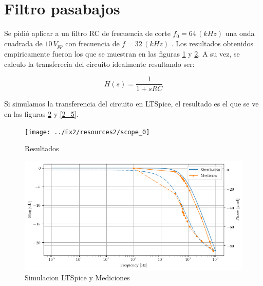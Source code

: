 \section{Filtro pasabajos}

Se pidió aplicar a un filtro RC de frecuencia de corte $f_{0}=64\,(kHz)$
una onda cuadrada de $10\,V_{pp}$ con frecuencia de $f=32\,(kHz)$
. Los resultados obtenidos empiricamente fueron los que se muestran
en las figuras \ref{2_1} y \ref{2_4}. A su vez, se calculo la transferecia
del circuito idealmente resultando ser:

\begin{equation}
H(s)=\frac{1}{1+sRC}\label{eq:2_4}
\end{equation}

Si simulamos la transferencia del circuito en LTSpice, el resultado
es el que se ve en las figuras \ref{2_4} y \ref{2_5}.

\begin{figure}[H]
\begin{centering}
\texttt{[image: ../Ex2/resources2/scope\_0]} 
\par\end{centering}
\caption{Resultados}
\label{2_1} 
\end{figure}

\begin{figure}[H]
\begin{centering}
\includegraphics[scale=0.65]{../Ex2/resources2/MedyPost} 
\par\end{centering}
\caption{Simulacion LTSpice y Mediciones}
\label{2_4}
\end{figure}

